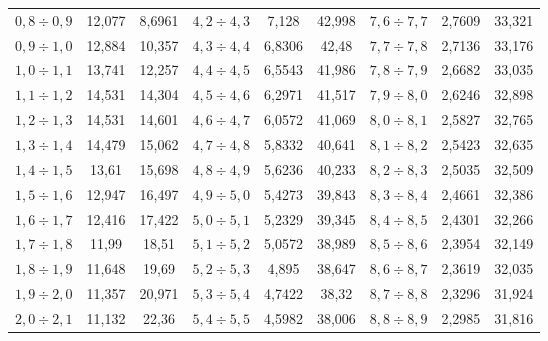 \begin{table}
\begin{center}
\begin{tabular}{||c|c|c||c|c|c||c|l|l||}
$   0{,}8  \div   0{,}9 $ & 12{,}077  &   \hphantom{99}8{,}6961  & $ 4{,}2  \div   4{,}3 $ & 7{,}128\hphantom{9}   &   42{,}998  & $ 7{,}6  \div   7{,}7 $ & 2{,}7609  &   33{,}321  \\
$   0{,}9  \div   1{,}0   $ & 12{,}884  &   10{,}357  & $ 4{,}3  \div   4{,}4 $ & 6{,}8306  &   42{,}48\hphantom{9}   & $ 7{,}7  \div   7{,}8 $ & 2{,}7136  &   33{,}176  \\
$   1 {,}0   \div   1{,}1 $ & 13{,}741  &   12{,}257  & $ 4{,}4  \div   4{,}5 $ & 6{,}5543  &   41{,}986  & $ 7{,}8  \div   7{,}9 $ & 2{,}6682  &   33{,}035  \\
$   1{,}1  \div   1{,}2 $ & 14{,}531  &   14{,}304  & $ 4{,}5  \div   4{,}6 $ & 6{,}2971  &   41{,}517  & $ 7{,}9  \div   8{,}0   $ & 2{,}6246  &   32{,}898  \\
$   1{,}2  \div   1{,}3 $ & 14{,}531  &   14{,}601  & $ 4{,}6  \div   4{,}7 $ & 6{,}0572  &   41{,}069  & $ 8{,}0  \div   8{,}1 $ & 2{,}5827  &   32{,}765  \\
$   1{,}3  \div   1{,}4 $ & 14{,}479  &   15{,}062  & $ 4{,}7  \div   4{,}8 $ & 5{,}8332  &   40{,}641  & $ 8{,}1  \div   8{,}2 $ & 2{,}5423  &   32{,}635  \\
$   1{,}4  \div   1{,}5 $ & 13{,}61\hphantom{9}   &   15{,}698  & $ 4{,}8  \div   4{,}9 $ & 5{,}6236  &   40{,}233  & $ 8{,}2  \div   8{,}3 $ & 2{,}5035  &   32{,}509  \\
$   1{,}5  \div   1{,}6 $ & 12{,}947  &   16{,}497  & $ 4{,}9  \div   5{,}0  $ & 5{,}4273  &   39{,}843  & $ 8{,}3  \div   8{,}4 $ & 2{,}4661  &   32{,}386  \\
$   1{,}6  \div   1{,}7 $ & 12{,}416  &   17{,}422  & $ 5{,}0  \div   5{,}1 $ & 5{,}2329  &   39{,}345  & $ 8{,}4  \div   8{,}5 $ & 2{,}4301  &   32{,}266  \\
$   1{,}7  \div   1{,}8 $ & 11{,}99\hphantom{9}   &   18{,}51\hphantom{9}   & $ 5{,}1  \div   5{,}2 $ & 5{,}0572  &   38{,}989  & $ 8{,}5  \div   8{,}6 $ & 2{,}3954  &   32{,}149  \\
$   1{,}8  \div   1{,}9 $ & 11{,}648  &   19{,}69\hphantom{9}   & $ 5{,}2  \div   5{,}3 $ & 4{,}895\hphantom{9}   &   38{,}647  & $ 8{,}6  \div   8{,}7 $ & 2{,}3619  &   32{,}035  \\
$   1{,}9  \div   2{,}0   $ & 11{,}357  &   20{,}971  & $ 5{,}3  \div   5{,}4 $ & 4{,}7422  &   38{,}32\hphantom{9}   & $ 8{,}7  \div   8{,}8 $ & 2{,}3296  &   31{,}924  \\
$   2{,}0    \div   2{,}1 $ & 11{,}132  &   22{,}36\hphantom{9}   & $ 5{,}4  \div   5{,}5 $ & 4{,}5982  &   38{,}006  & $ 8{,}8  \div   8{,}9 $ & 2{,}2985  &   31{,}816  \\

\end{tabular}
\end{center}
\end{table}
